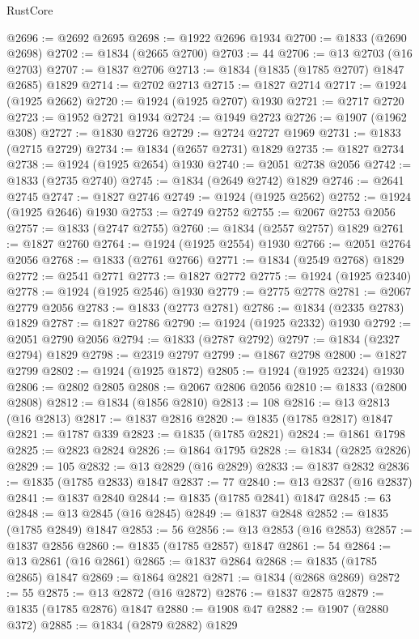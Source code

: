 \begin{lexlean}{RustCore}
\begin{coremodule}
@2696 := @2692 @2695
@2698 := @1922 @2696 @1934
@2700 := @1833 (@2690 @2698)
@2702 := @1834 (@2665 @2700)
@2703 := 44
@2706 := @13 @2703 (@16 @2703)
@2707 := @1837 @2706
@2713 := @1834 (@1835 (@1785 @2707) @1847 @2685) @1829
@2714 := @2702 @2713
@2715 := @1827 @2714
@2717 := @1924 (@1925 @2662)
@2720 := @1924 (@1925 @2707) @1930
@2721 := @2717 @2720
@2723 := @1952 @2721 @1934
@2724 := @1949 @2723
@2726 := @1907 (@1962 @308)
@2727 := @1830 @2726
@2729 := @2724 @2727 @1969
@2731 := @1833 (@2715 @2729)
@2734 := @1834 (@2657 @2731) @1829
@2735 := @1827 @2734
@2738 := @1924 (@1925 @2654) @1930
@2740 := @2051 @2738 @2056
@2742 := @1833 (@2735 @2740)
@2745 := @1834 (@2649 @2742) @1829
@2746 := @2641 @2745
@2747 := @1827 @2746
@2749 := @1924 (@1925 @2562)
@2752 := @1924 (@1925 @2646) @1930
@2753 := @2749 @2752
@2755 := @2067 @2753 @2056
@2757 := @1833 (@2747 @2755)
@2760 := @1834 (@2557 @2757) @1829
@2761 := @1827 @2760
@2764 := @1924 (@1925 @2554) @1930
@2766 := @2051 @2764 @2056
@2768 := @1833 (@2761 @2766)
@2771 := @1834 (@2549 @2768) @1829
@2772 := @2541 @2771
@2773 := @1827 @2772
@2775 := @1924 (@1925 @2340)
@2778 := @1924 (@1925 @2546) @1930
@2779 := @2775 @2778
@2781 := @2067 @2779 @2056
@2783 := @1833 (@2773 @2781)
@2786 := @1834 (@2335 @2783) @1829
@2787 := @1827 @2786
@2790 := @1924 (@1925 @2332) @1930
@2792 := @2051 @2790 @2056
@2794 := @1833 (@2787 @2792)
@2797 := @1834 (@2327 @2794) @1829
@2798 := @2319 @2797
@2799 := @1867 @2798
@2800 := @1827 @2799
@2802 := @1924 (@1925 @1872)
@2805 := @1924 (@1925 @2324) @1930
@2806 := @2802 @2805
@2808 := @2067 @2806 @2056
@2810 := @1833 (@2800 @2808)
@2812 := @1834 (@1856 @2810)
@2813 := 108
@2816 := @13 @2813 (@16 @2813)
@2817 := @1837 @2816
@2820 := @1835 (@1785 @2817) @1847
@2821 := @1787 @339
@2823 := @1835 (@1785 @2821)
@2824 := @1861 @1798
@2825 := @2823 @2824
@2826 := @1864 @1795
@2828 := @1834 (@2825 @2826)
@2829 := 105
@2832 := @13 @2829 (@16 @2829)
@2833 := @1837 @2832
@2836 := @1835 (@1785 @2833) @1847
@2837 := 77
@2840 := @13 @2837 (@16 @2837)
@2841 := @1837 @2840
@2844 := @1835 (@1785 @2841) @1847
@2845 := 63
@2848 := @13 @2845 (@16 @2845)
@2849 := @1837 @2848
@2852 := @1835 (@1785 @2849) @1847
@2853 := 56
@2856 := @13 @2853 (@16 @2853)
@2857 := @1837 @2856
@2860 := @1835 (@1785 @2857) @1847
@2861 := 54
@2864 := @13 @2861 (@16 @2861)
@2865 := @1837 @2864
@2868 := @1835 (@1785 @2865) @1847
@2869 := @1864 @2821
@2871 := @1834 (@2868 @2869)
@2872 := 55
@2875 := @13 @2872 (@16 @2872)
@2876 := @1837 @2875
@2879 := @1835 (@1785 @2876) @1847
@2880 := @1908 @47
@2882 := @1907 (@2880 @372)
@2885 := @1834 (@2879 @2882) @1829

\end{coremodule}
\end{lexlean}
